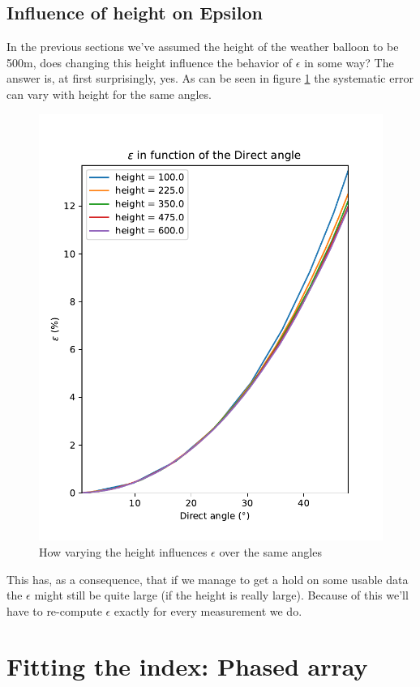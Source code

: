 \subsection{Influence of height on Epsilon}
In the previous sections we've assumed the height of the weather balloon to be
500m, does changing this height influence the behavior of $\epsilon$ in some
way?  The answer is, at first surprisingly, yes. As can be seen in figure
\ref{fig:EpsWithHeight} the systematic error can vary with height for the same angles.
\begin{figure}
	\centering
	\includegraphics[height=0.4\textheight]{figures/EpsilonWithHeight.pdf}
	\caption{How varying the height influences $\epsilon$ over the same angles}
	\label{fig:EpsWithHeight}
\end{figure}
This has, as a consequence, that if we manage to get a hold on some
usable data the $\epsilon$
might still be quite large (if the height is really large).
Because of this we'll have to re-compute $\epsilon$ exactly for 
every measurement we do.
\section{Fitting the index: Phased array}
